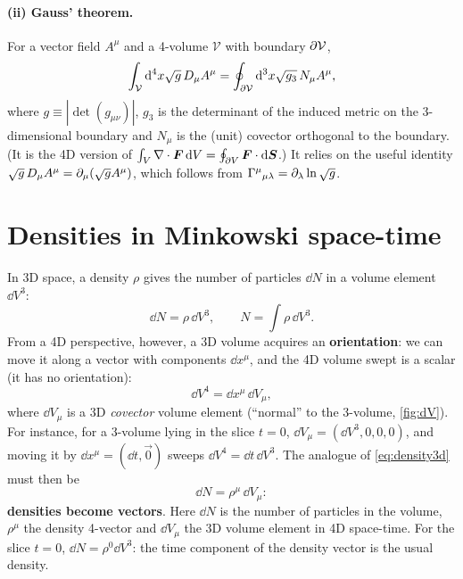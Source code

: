 \paragraph{(ii) Gauss' theorem.} For a vector field $A^\mu$ and a 4-volume $\mathcal V$ with boundary $\partial\mathcal V$,
\begin{equation}
  \int_{\mathcal V}\mathrm{d}^4x\sqrt{g}\,D_\mu A^\mu=\oint_{\partial\mathcal V}\mathrm{d}^3x\sqrt{g_3}\,N_\mu A^\mu ,
\end{equation}
where $g\equiv|\det(g_{\mu\nu})|$, $g_3$ is the determinant of the induced metric on the 3-dimensional boundary and $N_\mu$ is the (unit) covector orthogonal to the boundary. (It is the 4D version of $\int_V\nabla\cdot\bm{F}\,\mathrm{d} V=\oint_{\partial V}\bm{F}\cdot\mathrm{d}\bm{S}$.) It relies on the useful identity $\sqrt g\,D_\mu A^\mu=\partial_\mu(\sqrt g A^\mu)$, which follows from $\Gamma^{\mu}{}_{\mu\lambda}=\partial_\lambda\ln\sqrt g$.

\section{Densities in Minkowski space-time}

In 3D space, a density $\rho$ gives the number of particles $\dd N$ in a volume element $\dd V^3$:
\begin{equation}
  \dd N=\rho\,\dd V^3,\qquad N=\int\rho\,\dd V^3 .
  \label{eq:density3d}
\end{equation}
From a 4D perspective, however, a 3D volume acquires an \textbf{orientation}: we can move it along a vector with components $\dd x^\mu$, and the 4D volume swept is a scalar (it has no orientation):
\begin{equation}
  \dd V^4=\dd x^\mu\,\dd V_\mu ,
\end{equation}
where $\dd V_\mu$ is a 3D \emph{covector} volume element (``normal'' to the 3-volume, \cref{fig:dV}). For instance, for a 3-volume lying in the slice $t=0$, $\dd V_\mu=(\dd V^3,0,0,0)$, and moving it by $\dd x^\mu=(\dd t,\vec 0)$ sweeps $\dd V^4=\dd t\,\dd V^3$. The analogue of \eqref{eq:density3d} must then be
\begin{equation}
  \boxed{\dd N=\rho^\mu\,\dd V_\mu}:
\end{equation}
\textbf{densities become vectors}. Here $\dd N$ is the number of particles in the volume, $\rho^\mu$ the density 4-vector and $\dd V_\mu$ the 3D volume element in 4D space-time. For the slice $t=0$, $\dd N=\rho^0\dd V^3$: the time component of the density vector is the usual density.

